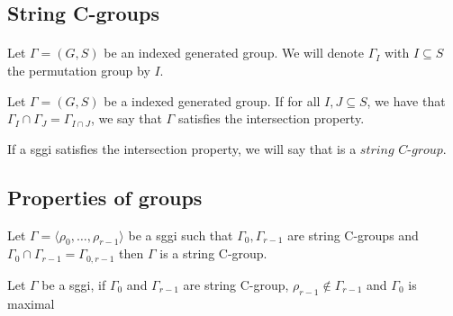 \subsection{String C-groups}

\paragraph{}
Let $\Gamma = (G,S)$ be an indexed generated group. We will denote $\Gamma_I$ with $I \subseteq S$ the permutation group by $I$.

\begin{definition}
  Let $\Gamma = (G,S)$ be a indexed generated group. If for all $I, J \subseteq S$, we have that $\Gamma_I \cap \Gamma_J = \Gamma_{I \cap J}$, we say that $\Gamma$ satisfies the intersection property.
\end{definition}

\begin{definition}
  If a sggi satisfies the intersection property, we will say that is a $\textit{string C-group}$.
\end{definition}

\subsection{Properties of groups}

\begin{property}
  Let $\Gamma = \langle \rho_0, \dots, \rho_{r-1} \rangle$ be a sggi such that $\Gamma_0, \Gamma_{r-1}$ are string C-groups and $\Gamma_0 \cap \Gamma_{r-1} = \Gamma_{0,r-1}$ then $\Gamma$ is a string C-group.
\end{property}

\begin{property}
  Let $\Gamma$ be a sggi, if $\Gamma_0$ and $\Gamma_{r-1}$ are string C-group, $\rho_{r-1} \notin \Gamma_{r-1}$ and $\Gamma_0$ is maximal
\end{property}
